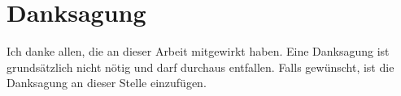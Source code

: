 \chapter*{Danksagung}
Ich danke allen, die an dieser Arbeit mitgewirkt haben. Eine Danksagung ist
grundsätzlich nicht nötig und darf durchaus entfallen. Falls gewünscht, ist die
Danksagung an dieser Stelle einzufügen.
